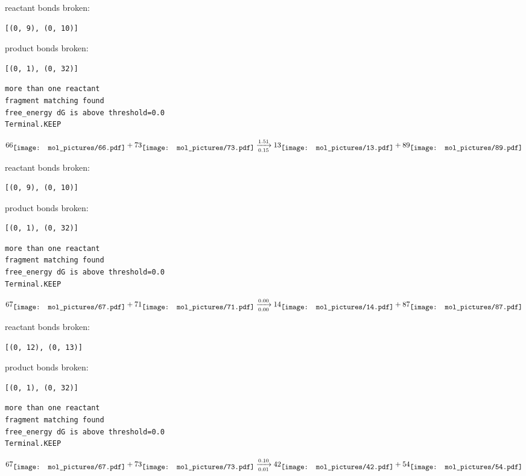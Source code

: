 \documentclass{article}
\begin{document}
reactant bonds broken:\begin{verbatim}
[(0, 9), (0, 10)]
\end{verbatim}
product bonds broken:\begin{verbatim}
[(0, 1), (0, 32)]
\end{verbatim}




\vspace{1cm}
\begin{verbatim}
more than one reactant
fragment matching found
free_energy dG is above threshold=0.0
Terminal.KEEP
\end{verbatim}
$$
66
\raisebox{-.5\height}{\texttt{[image: mol\_pictures/66.pdf]}}
+
73
\raisebox{-.5\height}{\texttt{[image: mol\_pictures/73.pdf]}}
\xrightarrow[0.15]{1.51}
13
\raisebox{-.5\height}{\texttt{[image: mol\_pictures/13.pdf]}}
+
89
\raisebox{-.5\height}{\texttt{[image: mol\_pictures/89.pdf]}}
$$


reactant bonds broken:\begin{verbatim}
[(0, 9), (0, 10)]
\end{verbatim}
product bonds broken:\begin{verbatim}
[(0, 1), (0, 32)]
\end{verbatim}




\vspace{1cm}
\begin{verbatim}
more than one reactant
fragment matching found
free_energy dG is above threshold=0.0
Terminal.KEEP
\end{verbatim}
$$
67
\raisebox{-.5\height}{\texttt{[image: mol\_pictures/67.pdf]}}
+
71
\raisebox{-.5\height}{\texttt{[image: mol\_pictures/71.pdf]}}
\xrightarrow[0.00]{0.00}
14
\raisebox{-.5\height}{\texttt{[image: mol\_pictures/14.pdf]}}
+
87
\raisebox{-.5\height}{\texttt{[image: mol\_pictures/87.pdf]}}
$$


reactant bonds broken:\begin{verbatim}
[(0, 12), (0, 13)]
\end{verbatim}
product bonds broken:\begin{verbatim}
[(0, 1), (0, 32)]
\end{verbatim}




\vspace{1cm}
\begin{verbatim}
more than one reactant
fragment matching found
free_energy dG is above threshold=0.0
Terminal.KEEP
\end{verbatim}
$$
67
\raisebox{-.5\height}{\texttt{[image: mol\_pictures/67.pdf]}}
+
73
\raisebox{-.5\height}{\texttt{[image: mol\_pictures/73.pdf]}}
\xrightarrow[0.01]{0.10}
42
\raisebox{-.5\height}{\texttt{[image: mol\_pictures/42.pdf]}}
+
54
\raisebox{-.5\height}{\texttt{[image: mol\_pictures/54.pdf]}}
$$
\end{document}
